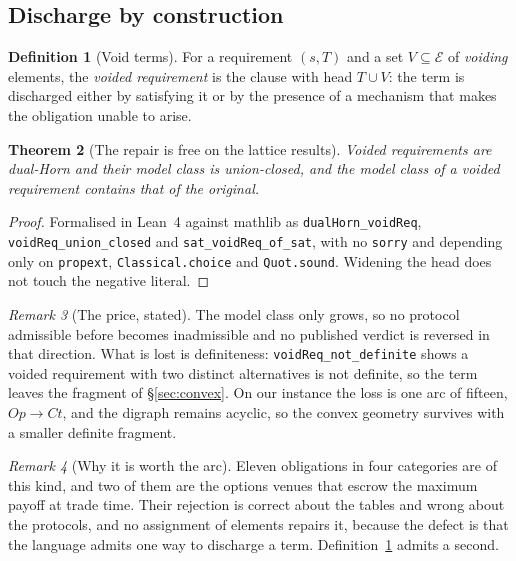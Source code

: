 \documentclass[11pt,reqno]{amsart}
\theoremstyle{plain}
\newtheorem{theorem}{Theorem}[section]
\theoremstyle{definition}
\newtheorem{definition}[theorem]{Definition}
\theoremstyle{remark}
\newtheorem{remark}[theorem]{Remark}
\newcommand{\El}{\mathcal{E}}
\begin{document}
\subsection{Discharge by construction}

\begin{definition}[Void terms]\label{def:void}
For a requirement $(s,T)$ and a set $V \subseteq \El$ of \emph{voiding}
elements, the \emph{voided requirement} is the clause with head $T \cup V$: the
term is discharged either by satisfying it or by the presence of a mechanism
that makes the obligation unable to arise.
\end{definition}

\begin{theorem}[The repair is free on the lattice results]\label{thm:void}
Voided requirements are dual-Horn and their model class is union-closed, and the
model class of a voided requirement contains that of the original.
\end{theorem}

\begin{proof}
Formalised in Lean~4 against mathlib as \texttt{dualHorn\_voidReq},
\texttt{voidReq\_union\_closed} and \texttt{sat\_voidReq\_of\_sat}, with no
\texttt{sorry} and depending only on \texttt{propext},
\texttt{Classical.choice} and \texttt{Quot.sound}. Widening the head does not
touch the negative literal.
\end{proof}

\begin{remark}[The price, stated]
The model class only grows, so no protocol admissible before becomes
inadmissible and no published verdict is reversed in that direction. What is
lost is definiteness: \texttt{voidReq\_not\_definite} shows a voided requirement
with two distinct alternatives is not definite, so the term leaves the fragment
of \S\ref{sec:convex}. On our instance the loss is one arc of fifteen,
$Op \to Ct$, and the digraph remains acyclic, so the convex geometry survives
with a smaller definite fragment.
\end{remark}

\begin{remark}[Why it is worth the arc]
Eleven obligations in four categories are of this kind, and two of them are the
options venues that escrow the maximum payoff at trade time. Their rejection is
correct about the tables and wrong about the protocols, and no assignment of
elements repairs it, because the defect is that the language admits one way to
discharge a term. Definition~\ref{def:void} admits a second.
\end{remark}
\end{document}
